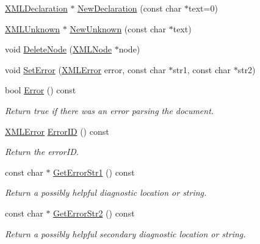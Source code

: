 \begin{DoxyCompactItemize}
\hyperlink{classtinyxml2_1_1_x_m_l_declaration}{X\-M\-L\-Declaration} $\ast$ \hyperlink{classtinyxml2_1_1_x_m_l_document_ae519030c0262fa2daff8993681990e16}{New\-Declaration} (const char $\ast$text=0)
\item 
\hyperlink{classtinyxml2_1_1_x_m_l_unknown}{X\-M\-L\-Unknown} $\ast$ \hyperlink{classtinyxml2_1_1_x_m_l_document_a4954f502c5fd7f49de54c3c0c99bb73d}{New\-Unknown} (const char $\ast$text)
\item 
void \hyperlink{classtinyxml2_1_1_x_m_l_document_ac1d6e2c7fcc1a660624ac4f68e96380d}{Delete\-Node} (\hyperlink{classtinyxml2_1_1_x_m_l_node}{X\-M\-L\-Node} $\ast$node)
\item 
void \hyperlink{classtinyxml2_1_1_x_m_l_document_ae38d194e47336e4c96677ac77e2ac5d4}{Set\-Error} (\hyperlink{namespacetinyxml2_a1fbf88509c3ac88c09117b1947414e08}{X\-M\-L\-Error} error, const char $\ast$str1, const char $\ast$str2)
\item 
bool \hyperlink{classtinyxml2_1_1_x_m_l_document_abf0f9ac4c3aa5698a785937f71f7a69f}{Error} () const 
\begin{DoxyCompactList}\small\item\em Return true if there was an error parsing the document. \end{DoxyCompactList}\item 
\hyperlink{namespacetinyxml2_a1fbf88509c3ac88c09117b1947414e08}{X\-M\-L\-Error} \hyperlink{classtinyxml2_1_1_x_m_l_document_a34903418c9e83f27945c2c533839e350}{Error\-I\-D} () const 
\begin{DoxyCompactList}\small\item\em Return the error\-I\-D. \end{DoxyCompactList}\item 
const char $\ast$ \hyperlink{classtinyxml2_1_1_x_m_l_document_a016ccebecee36fe92084b5dfee6cc072}{Get\-Error\-Str1} () const 
\begin{DoxyCompactList}\small\item\em Return a possibly helpful diagnostic location or string. \end{DoxyCompactList}\item 
const char $\ast$ \hyperlink{classtinyxml2_1_1_x_m_l_document_a88f6b44bd019033bda28abd31fe257b2}{Get\-Error\-Str2} () const 
\begin{DoxyCompactList}\small\item\em Return a possibly helpful secondary diagnostic location or string. \end{DoxyCompactList}\item 

\end{DoxyCompactItemize}
